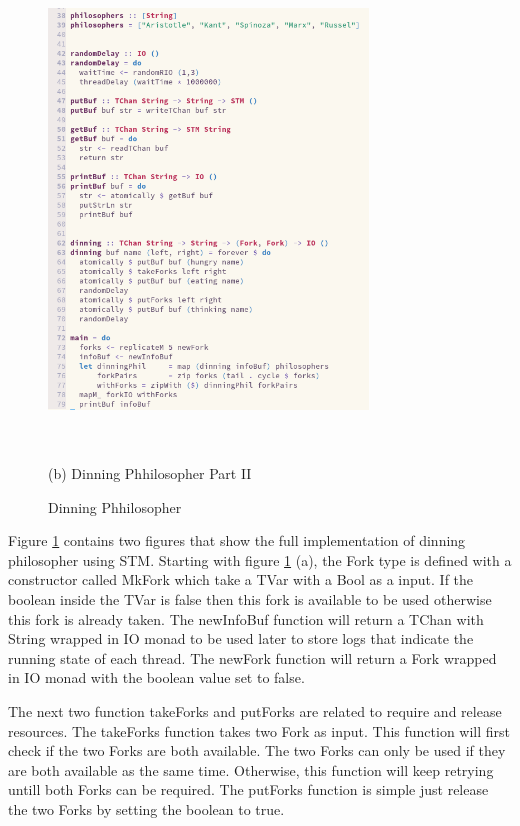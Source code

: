 \documentclass{article}
\begin{document}
\begin{normalsize}
\begin{figure}[H]
\begin{minipage}[b]{0.48\linewidth}
      \centerline{\includegraphics[width=8.5cm, height=12.5cm]{dinning2}}
      \centerline{ (b) Dinning Phhilosopher Part II }\medskip
    \end{minipage}
    \caption{Dinning Phhilosopher}
    \label{fig:dinning}
  \end{figure}

  Figure \ref{fig:dinning} contains two figures that show the full
  implementation of dinning philosopher using STM. Starting with figure
  \ref{fig:dinning} (a), the Fork type is defined with a constructor called
  MkFork which take a TVar with a Bool as a input. If the boolean inside the
  TVar is false then this fork is available to be used otherwise this fork is
  already taken. The newInfoBuf function will return a TChan with String wrapped
  in IO monad to be used later to store logs that indicate the running state of
  each thread. The newFork function will return a Fork wrapped in IO monad with
  the boolean value set to false.

  The next two function takeForks and putForks are related to require and
  release resources. The takeForks function takes two Fork as input. This
  function will first check if the two Forks are both available. The two Forks
  can only be used if they are both available as the same time. Otherwise, this
  function will keep retrying untill both Forks can be required. The putForks
  function is simple just release the two Forks by setting the boolean to true.


\end{normalsize}
\end{document}
